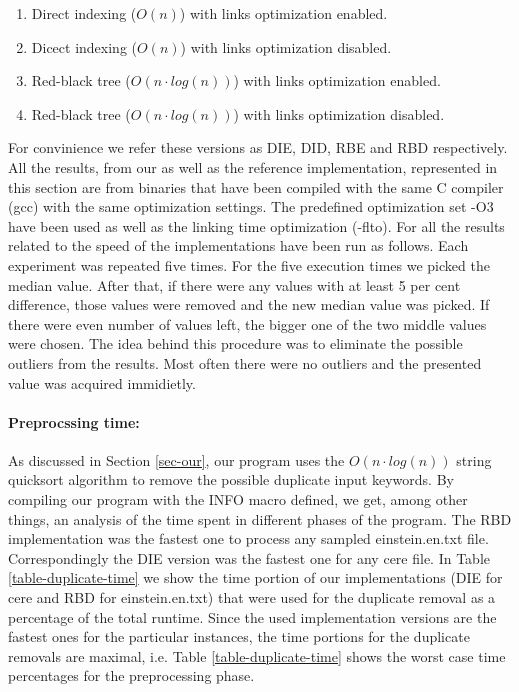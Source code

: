 \documentclass[english,twoside,censored,csm,algorithms-track-2020]{HYthesisML}
\theoremstyle{plain}
\theoremstyle{definition}
\begin{document}
\begin{enumerate}
\item Direct indexing ($O(n)$) with links optimization enabled.
\item Dicect indexing ($O(n)$) with links optimization disabled.
\item Red-black tree ($O(n\cdot log(n))$) with links optimization enabled.
\item Red-black tree ($O(n\cdot log(n))$) with links optimization disabled.
\end{enumerate}

For convinience we refer these versions as DIE, DID, RBE and RBD respectively. All the results,
from our as well as the reference implementation,
represented in this section are from binaries that have been compiled with the same C
compiler (gcc) with the same optimization settings. The predefined optimization set -O3 have
been used as well as the linking time optimization (-flto). For all the results related to the
speed of the implementations have been run as follows. Each experiment was repeated five times. For
the five execution times we picked the median value. After that, if there were any values with 
at least 5 per cent difference, those values were removed and the new median value was picked.
If there were even number of values left, the bigger one of the two middle values were chosen.
The idea behind this procedure was to eliminate the possible outliers from the results. Most often
there were no outliers and the presented value was acquired immidietly.

\paragraph{Preprocssing time:}
As discussed in Section \ref{sec-our}, our program uses the $O(n\cdot log(n))$ string quicksort
algorithm to remove the possible duplicate input keywords. By compiling our program with the
INFO macro defined, we get, among other things, an analysis of the time spent in different phases
of the program. The RBD implementation was the fastest one to process any sampled einstein.en.txt
file. Correspondingly the DIE version was the fastest one for any cere file. In Table
\ref{table-duplicate-time}
we show the time portion of our implementations (DIE for cere and RBD for einstein.en.txt) that were
used for the duplicate removal as a percentage of the total runtime. Since the used  implementation
versions are the fastest ones for the particular instances, the time portions for the duplicate
removals are maximal, i.e. Table \ref{table-duplicate-time} shows the worst case time percentages
for the preprocessing phase.
\end{document}
